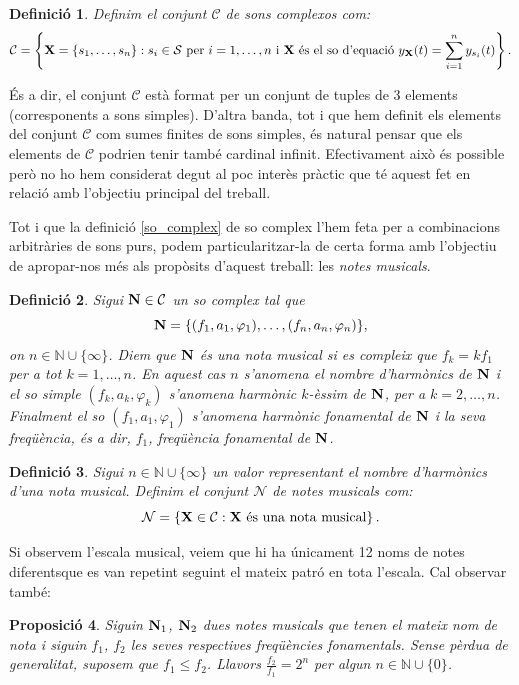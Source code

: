 \documentclass{article}
\theoremstyle{math}
\newtheorem{definition}{Definició}[section]
\newtheorem{prop}[definition]{Proposició}
\newcommand{\0}{\ensuremath{\vb{0}}}
\newcommand{\N}{\ensuremath{\vb{N}}}
\newcommand{\X}{\ensuremath{\vb{X}}}
\newcommand{\NN}{\ensuremath{\mathbb{N}}} %
\begin{document}
\begin{definition}
    Definim el conjunt $\mathcal{C}$ de sons complexos com:
    $$\mathcal{C}=\left\{\X=\{s_1,\ldots,s_n\}:s_i\in\mathcal{S}\text{ per } i=1,\ldots,n\text{ i $\X$ és el so d'equació }y_{\X}(t)=\sum_{i=1}^ny_{s_i}(t)\right\}.$$
\end{definition}
És a dir, el conjunt $\mathcal{C}$ està format per un conjunt de tuples de 3 elements (corresponents a sons simples). D'altra banda, tot i que hem definit els elements del conjunt $\mathcal{C}$ com sumes finites de sons simples, és natural pensar que els elements de $\mathcal{C}$ podrien tenir també cardinal infinit. Efectivament això és possible però no ho hem considerat degut al poc interès pràctic que té aquest fet en relació amb l'objectiu principal del treball.\par
Tot i que la definició \ref{so_complex} de so complex l'hem feta per a combinacions arbitràries de sons purs, podem  particularitzar-la de certa forma amb l'objectiu de apropar-nos més als propòsits d'aquest treball: les \textit{notes musicals}.
\begin{definition}
    Sigui $\N\in\mathcal{C}$ un so complex tal que $$\N=\{(f_1,a_1,\varphi_1),\ldots,(f_n,a_n,\varphi_n)\},$$ on $n\in\NN\cup\{\infty\}$. Diem que $\N$ és una \textit{nota musical} si es compleix que $f_k=kf_1$ per a tot $k=1,\ldots,n$. En aquest cas $n$ s'anomena el \textit{nombre d'harmònics de $\N$} i el so simple $(f_k,a_k,\varphi_k)$ s'anomena \textit{harmònic $k$-èssim de $\N$}, per a $k=2,\ldots,n$. Finalment el so $(f_1,a_1,\varphi_1)$ s'anomena \textit{harmònic fonamental de $\N$} i la seva freqüència, és a dir, $f_1$, \textit{freqüència fonamental de $\N$}.
\end{definition}
\begin{definition}
    Sigui $n\in\NN\cup\{\infty\}$ un valor representant el nombre d'harmònics d'una nota musical. Definim el conjunt $\mathcal{N}$ de notes musicals com: $$\mathcal{N}=\left\{\X\in\mathcal{C}:\X\text{ és una nota musical}\right\}.$$
\end{definition}
Si observem l'escala musical, veiem que hi ha únicament 12 noms de notes diferents\footnotemark\space que es van repetint seguint el mateix patró en tota l'escala. Cal observar també:
\begin{prop}
  Siguin $\N_1$, $\N_2$ dues notes musicals que tenen el mateix nom de nota i siguin $f_1$, $f_2$ les seves respectives freqüències fonamentals. Sense pèrdua de generalitat, suposem que $f_1 \leq f_2$. Llavors $\frac{f_{2}}{f_{1}} = 2^n$ per algun $n \in \mathbb{N}\cup\{0\}$.
\end{prop}
\end{document}
